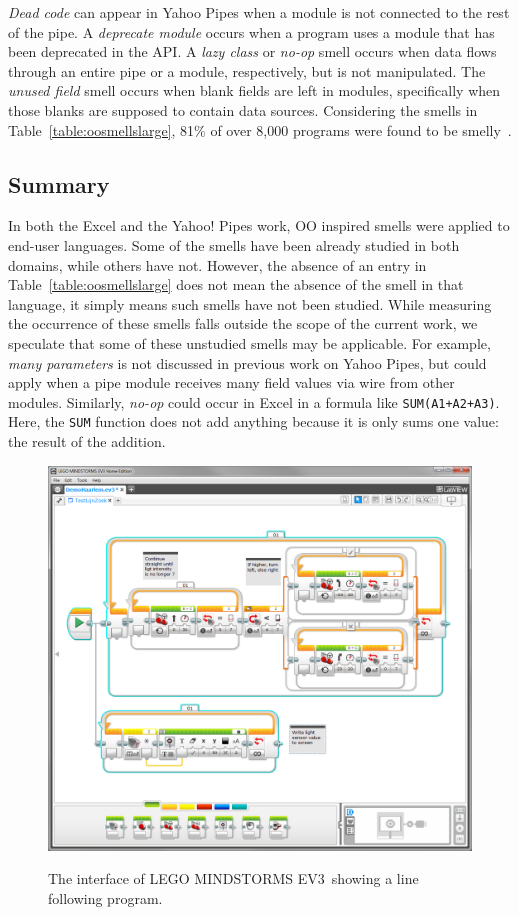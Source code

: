 \documentclass{sig-alternate}
\newcommand{\ms}{LEGO MINDSTORMS EV3}
\begin{document}
\emph{Dead code} can appear in Yahoo Pipes when a module is not connected to the rest of the pipe. A  \emph{deprecate module} occurs when a program uses a module that has been deprecated in the API. A \emph{lazy class} or \emph{no-op} smell occurs when data flows through an entire pipe or a module, respectively, but is not manipulated. The \emph{unused field} smell occurs when blank fields are left in modules, specifically when those blanks are supposed to contain data sources. Considering the smells in Table~\ref{table:oosmellslarge}, 81\% of over 8,000 programs were found to be smelly~\cite{Stolee2011,StoleeTSE2013}.

\subsection{Summary}
In both the Excel and the Yahoo! Pipes work, OO inspired smells were applied to end-user languages. Some of the smells have been already studied in both domains, while others have not. However, the absence of an entry in Table~\ref{table:oosmellslarge} does not mean the absence of the smell in that language, it simply means such smells have not been studied. While measuring the occurrence of these smells falls outside the scope of the current work, we speculate
that some of these unstudied smells may be applicable. 
For example, \emph{many parameters} is not discussed in previous work on Yahoo Pipes, but could apply when a pipe module receives many field values via wire from other modules. 
Similarly, \emph{no-op} could occur in Excel in a formula like {\tt SUM(A1+A2+A3)}. Here, the {\tt SUM} function does not add anything because it is only sums one value: the result of the addition. 


\begin{figure} [ht]
\caption{The interface of \ms~showing a line following program.}
\centering
\includegraphics[width=\columnwidth]{img/ms}
\label{fig:ms}
\end{figure}
\end{document}
